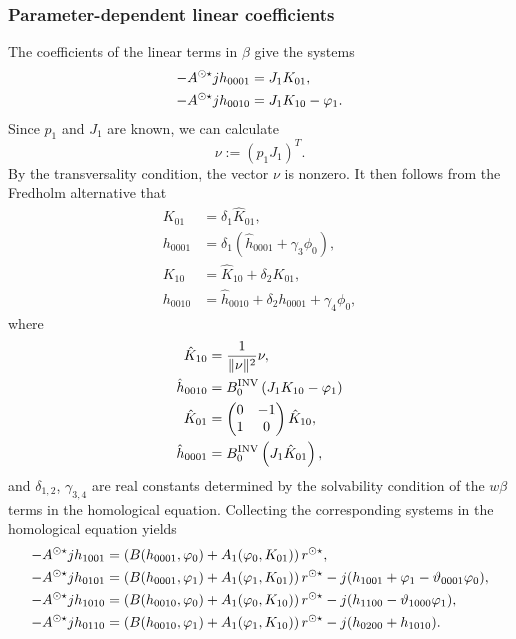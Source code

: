 \subsubsection{Parameter-dependent linear coefficients}
The coefficients of the linear terms in $\beta$ give the
systems
%
\begin{equation}
\label{btdde:eq:Assh0010}
\begin{aligned}
-A^{\odot\star}jh_{0001} &= J_1K_{01}, \\
-A^{\odot\star}jh_{0010} &= J_1K_{10} - \varphi_1.
\end{aligned}
\end{equation}
Since $p_1$ and $J_1$ are known, we can calculate 
\begin{equation*}
    \nu := (p_1 J_1)^T.
\end{equation*}
By the transversality condition, the vector $\nu$ is nonzero. It then follows
from the Fredholm alternative that
\begin{equation*}
\begin{aligned}
K_{01}   &= \delta_1\hat K_{01}, \\
h_{0001} &= \delta_1 \left( \hat h_{0001} + \gamma_3 \phi_0 \right), \\
K_{10}   &= \hat K_{10} + \delta_2 K_{01}, \\
h_{0010} &= \hat h_{0010} + \delta_2 h_{0001} + \gamma_4 \phi_0,
\end{aligned}
\end{equation*}
where
\begin{equation*}
\begin{aligned}
\hat K_{10}   &= \frac1{\|\nu\|^2}\nu, \\
\hat h_{0010} &= B^{\mathrm{INV}}_{0} \left( J_1K_{10} - \varphi_1 \right) \\
\hat K_{01}   &=
\begin{pmatrix}
    0 & -1 \\ 1 & 0
\end{pmatrix} \hat K_{10}, \\
\hat h_{0001} &= B^{\mathrm{INV}}_{0} \left( J_1\hat K_{01} \right),
\end{aligned}
\end{equation*}
and $\delta_{1,2}$, $\gamma_{3,4}$ are real constants determined by the
solvability condition of the $w\beta$ terms in the homological equation.
Collecting the corresponding systems in the homological equation yields 
\begin{align}
    -A^{\odot\star}jh_{1001} &= \left(B(h_{0001},\varphi_0) + A_1(\varphi_0,K_{01})\right)r^{\odot\star}, \label{btdde:eq:Assh1001} \\
    -A^{\odot\star}jh_{0101} &= \left(B(h_{0001},\varphi_1) + A_1(\varphi_1,K_{01})\right)r^{\odot\star}-j(h_{1001} + \varphi_1 - \vartheta_{0001}\varphi_0), \label{btdde:eq:Assh0101}\\
    -A^{\odot\star}jh_{1010} &= \left(B(h_{0010},\varphi_0) + A_1(\varphi_0,K_{10})\right)r^{\odot\star}-j(h_{1100} - \vartheta_{1000}\varphi_1), \nonumber \\
    -A^{\odot\star}jh_{0110} &= \left(B(h_{0010},\varphi_1) + A_1(\varphi_1,K_{10})\right)r^{\odot\star}-j(h_{0200} + h_{1010}) \nonumber.
\end{align}

